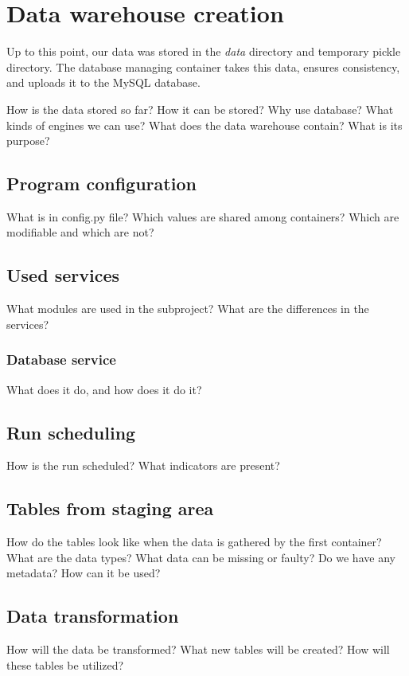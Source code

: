 \chapter{Data warehouse creation}
\label{ch:database}
Up to this point, our data was stored in the \textit{data} directory and temporary pickle directory. The database managing container takes this data, ensures consistency, and uploads it to the MySQL database.

How is the data stored so far? How it can be stored?
Why use database? What kinds of engines we can use?
What does the data warehouse contain? What is its purpose?


\section{Program configuration}
What is in config.py file? Which values are shared among containers? Which are
modifiable and which are not?


\section{Used services}
What modules are used in the subproject?
What are the differences in the services?

\subsection{Database service}
What does it do, and how does it do it?


\section{Run scheduling}
How is the run scheduled? What indicators are present?


\section{Tables from staging area}
How do the tables look like when the data is gathered by the first container?
What are the data types?
What data can be missing or faulty?
Do we have any metadata? How can it be used?


\section{Data transformation}
How will the data be transformed?
What new tables will be created?
How will these tables be utilized?
